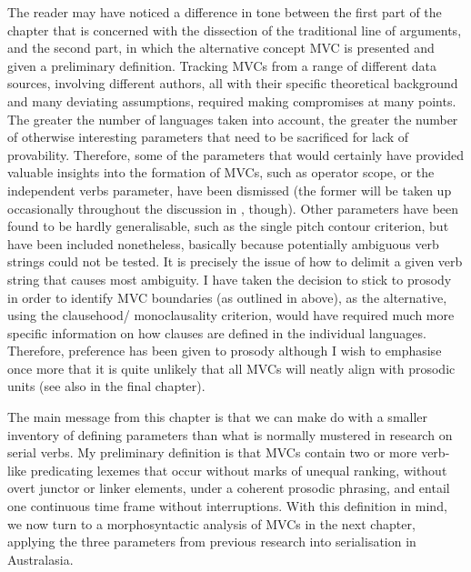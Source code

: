 The reader may have noticed a difference in tone between the first part of the chapter that is concerned with the dissection of the traditional line of arguments, and the second part, in which the alternative concept MVC is presented and given a preliminary definition. Tracking MVCs from a range of different data sources, involving different authors, all with their specific theoretical background and many deviating assumptions, required making compromises at many points. The greater the number of languages taken into account, the greater the number of otherwise interesting parameters that need to be sacrificed for lack of provability. Therefore, some of the parameters that would certainly have provided valuable insights into the formation of MVCs, such as operator scope, or the independent verbs parameter, have been dismissed (the former will be taken up occasionally throughout the discussion in , though). Other parameters have been found to be hardly generalisable, such as the single pitch contour criterion, but have been included nonetheless, basically because potentially ambiguous verb strings could not be tested. It is precisely the issue of how to delimit a given verb string that causes most ambiguity. I have taken the decision to stick to prosody in order to identify MVC boundaries (as outlined in  above), as the alternative, using the clausehood/ monoclausality criterion, would have required much more specific information on how clauses are defined in the individual languages. Therefore, preference has been given to prosody although I wish to emphasise once more that it is quite unlikely that all MVCs will neatly align with prosodic units (see also  in the final chapter).

The main message from this chapter is that we can make do with a smaller inventory of defining parameters than what is normally mustered in research on serial verbs. My preliminary definition is that MVCs contain two or more verb-like predicating lexemes that occur without marks of unequal ranking, without overt junctor or linker elements, under a coherent prosodic phrasing, and entail one continuous time frame without interruptions. With this definition in mind, we now turn to a morphosyntactic analysis of MVCs in the next chapter, applying the three parameters from previous research into serialisation in Australasia. 
